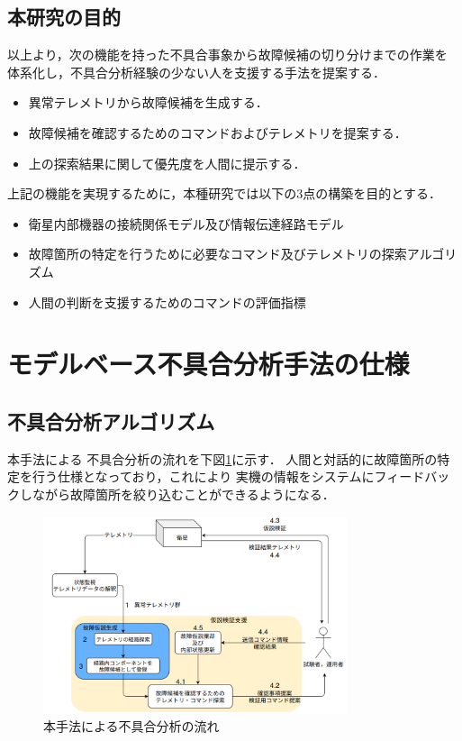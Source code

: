 \documentclass[11pt]{jsarticle}%
\begin{document}
\begin{multicols}{2}
\subsection{本研究の目的}
以上より，次の機能を持った不具合事象から故障候補の切り分けまでの作業を
体系化し，不具合分析経験の少ない人を支援する手法を提案する．
  \begin{itemize}
  \item 異常テレメトリから故障候補を生成する．
  \item 故障候補を確認するためのコマンドおよびテレメトリを提案する．
  \item 上の探索結果に関して優先度を人間に提示する．
\end{itemize}
上記の機能を実現するために，本種研究では以下の3点の構築を目的とする．%
\begin{itemize}
  \item 衛星内部機器の接続関係モデル及び情報伝達経路モデル
  \item 故障箇所の特定を行うために必要なコマンド及びテレメトリの探索アルゴリズム
  \item 人間の判断を支援するためのコマンドの評価指標
\end{itemize}
\vspace{-1zh}
\section{モデルベース不具合分析手法の仕様}
\vspace{-1zh}
\subsection{不具合分析アルゴリズム}
\vspace{-1zh}
本手法による
不具合分析の流れを下図\ref{fig:fault_diagnosis_flow}に示す．
人間と対話的に故障箇所の特定を行う仕様となっており，これにより
実機の情報をシステムにフィードバックしながら故障箇所を絞り込むことができるようになる．
\begin{figure}[H]
  \centering
    \includegraphics[height=5.8cm]{../figure/fault_diagnosis_flow.png}
    \caption{本手法による不具合分析の流れ}
    \label{fig:fault_diagnosis_flow}
\end{figure}


\end{multicols}
\end{document}
